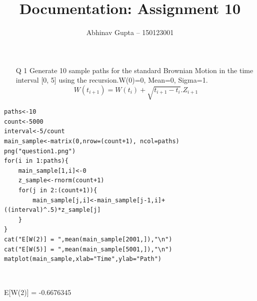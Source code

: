 \documentclass[11pt]{article}
\title{Documentation: Assignment 10}
\author{Abhinav Gupta -- 150123001}
\begin{document}
\titlepage
\newpage
\begin{enumerate}
\item[Q 1] Generate 10 sample paths for the standard Brownian Motion in the time interval [0, 5]
using the recursion.W(0)=0, Mean=0, Sigma=1.
\[W(t_{i+1}) = W(t_i)+\sqrt{t_{i+1}-t_i}.Z_{i+1}\]
\end{enumerate}
\begin{lstlisting}
paths<-10
count<-5000
interval<-5/count
main_sample<-matrix(0,nrow=(count+1), ncol=paths)
png("question1.png")
for(i in 1:paths){
	main_sample[1,i]<-0
	z_sample<-rnorm(count+1)
	for(j in 2:(count+1)){
		main_sample[j,i]<-main_sample[j-1,i]+((interval)^.5)*z_sample[j]
	}
}
cat("E[W(2)] = ",mean(main_sample[2001,]),"\n")
cat("E[W(5)] = ",mean(main_sample[5001,]),"\n")
matplot(main_sample,xlab="Time",ylab="Path")
\end{lstlisting}
\

E[W(2)] =  -0.6676345\
\end{document}
